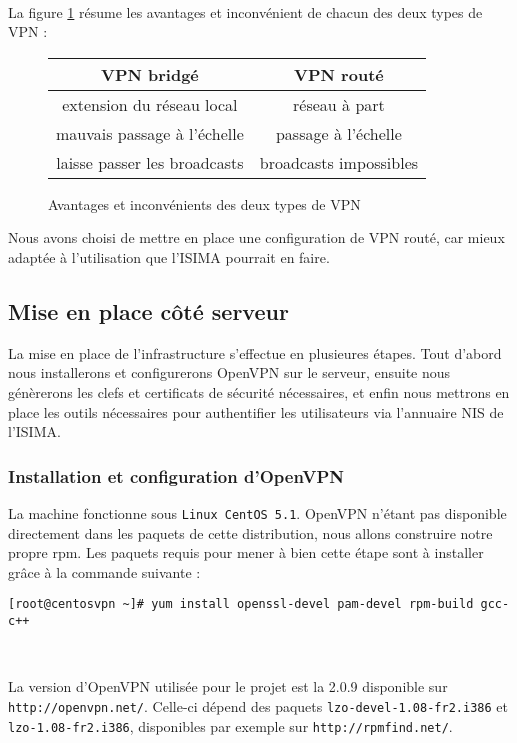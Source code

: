 ~

La figure \ref{tableau_types_vpn} résume les avantages et inconvénient de chacun des deux types de VPN :
\begin{figure}[H]
	\begin{center}
		\begin{tabular}{c|c}
			VPN bridgé & VPN routé \\
			\hline
			extension du réseau local & réseau à part \\
			mauvais passage à l'échelle & passage à l'échelle \\
			laisse passer les broadcasts & broadcasts impossibles \\
		\end{tabular}
	\end{center}
	\caption{Avantages et inconvénients des deux types de VPN}
	\label{tableau_types_vpn}
\end{figure}

Nous avons choisi de mettre en place une configuration de VPN routé, car mieux adaptée à l'utilisation que l'ISIMA pourrait en faire.

\subsection{Mise en place côté serveur}

La mise en place de l'infrastructure s'effectue en plusieures étapes. Tout d'abord nous installerons et configurerons OpenVPN sur le serveur, ensuite nous génèrerons les clefs et certificats de sécurité nécessaires, et enfin nous mettrons en place les outils nécessaires pour authentifier les utilisateurs via l'annuaire NIS de l'ISIMA.

\subsubsection{Installation et configuration d'OpenVPN}

La machine fonctionne sous \texttt{Linux CentOS 5.1}. OpenVPN n'étant pas disponible directement dans les paquets de cette distribution, nous allons construire notre propre rpm. Les paquets requis pour mener à bien cette étape sont à installer grâce à la commande suivante :

\verb|[root@centosvpn ~]# yum install openssl-devel pam-devel rpm-build gcc-c++|

~

La version d'OpenVPN utilisée pour le projet est la 2.0.9 disponible sur \verb|http://openvpn.net/|. Celle-ci dépend des paquets \verb|lzo-devel-1.08-fr2.i386| et \verb|lzo-1.08-fr2.i386|, disponibles par exemple sur \verb|http://rpmfind.net/|.

